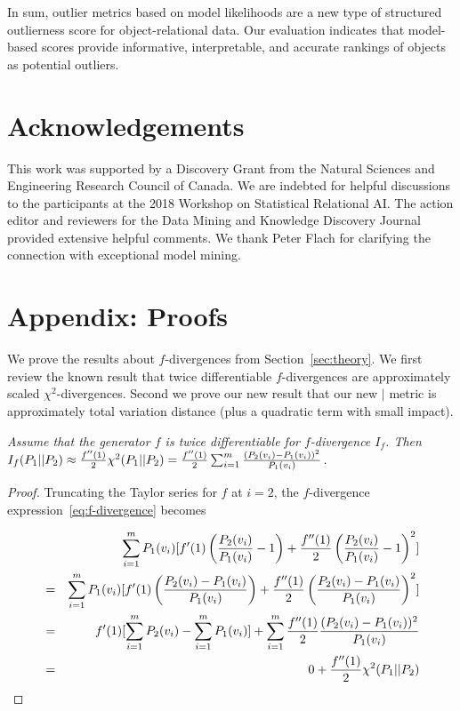 {								
In sum, outlier metrics based on model likelihoods are a new type of structured outlierness score for object-relational data.  Our evaluation indicates that  model-based scores provide informative, interpretable, and accurate rankings of objects as potential outliers. 
								
\section*{Acknowledgements} This work was supported by a Discovery Grant from the Natural Sciences and Engineering Research Council of Canada. We are indebted for helpful discussions to the participants at the 2018 Workshop on Statistical Relational AI. The action editor and reviewers for the Data Mining and Knowledge Discovery Journal provided extensive helpful comments. We thank Peter Flach for clarifying the connection with exceptional model mining.

\section*{Appendix: Proofs} \label{sec:proofs}

We prove the results about $f$-divergences from Section~\ref{sec:theory}. We first review the known result that twice differentiable $f$-divergences are approximately scaled $\chi^{2}$-divergences. Second we prove our new result that our new $\mid$ metric is approximately total variation distance (plus a quadratic term with small impact).  


{\em 
Assume that the generator $f$ is twice differentiable for $f$-divergence $I_{f}$. Then $I_{f}(P_{1}||P_{2}) \approx \frac{f''(1)}{2} \chi^{2}(P_{1}||P_{2}) = \frac{f''(1)}{2} 
\sum_{i=1}^{m}  \frac{(P_{2}(v_{i})-P_{1}(v_{i}))^{2}}
 {P_{1}(v_{i})}$. 
}
\begin{proof}

Truncating the Taylor series for $f$ at $i=2$, the $f$-divergence expression~\ref{eq:f-divergence} becomes 

\begin{eqnarray*}
& & \sum_{i=1}^{m} P_{1}(v_{i}) [f'(1) \left(\frac{P_{2}(v_{i})}{P_{1}(v_{i})}-1\right) + \frac{f''(1)}{2} \left(\frac{P_{2}(v_{i})}{P_{1}(v_{i})}-1\right)^{2}]  \\
& = &\sum_{i=1}^{m} P_{1}(v_{i}) [f'(1) \left(\frac{P_{2}(v_{i})-P_{1}(v_{i})}{P_{1}(v_{i})}\right) + \frac{f''(1)}{2} \left(\frac{P_{2}(v_{i})-P_{1}(v_{i})}{P_{1}(v_{i})}\right)^{2}] \\
 & = & f'(1) [\sum_{i=1}^{m} P_{2}(v_{i}) - \sum_{i=1}^{m} P_{1}(v_{i})] + \sum_{i=1}^{m} \frac{f''(1)}{2} 
 \frac{(P_{2}(v_{i})-P_{1}(v_{i}))^{2}}
 {P_{1}(v_{i})} \\
& = &   0 + \frac{f''(1)}{2} \chi^{2}(P_{1}||P_{2})
\end{eqnarray*}


\end{proof}}
